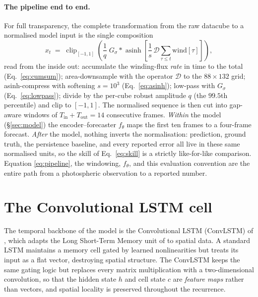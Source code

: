 \paragraph{The pipeline end to end.}
For full transparency, the complete transformation from the raw datacube to a
normalised model input is the single composition
\begin{equation}
  x_t \;=\; \operatorname{clip}_{[-1,1]}\!\left(
    \frac{1}{q}\; G_\sigma * \operatorname{asinh}\!\left[
      \frac{1}{s}\,\mathcal{D}\!\sum_{\tau\le t}\mathrm{wind}[\tau]
    \right]\right),
  \label{eq:pipeline}
\end{equation}
read from the inside out: accumulate the winding-flux \emph{rate} in time to the
total (Eq.~\eqref{eq:cumsum}); area-downsample with the operator $\mathcal{D}$ to
the $88\times132$ grid; asinh-compress with softening $s=10^3$
(Eq.~\eqref{eq:asinh}); low-pass with $G_\sigma$ (Eq.~\eqref{eq:lowpass}); divide
by the per-cube robust amplitude $q$ (the $99.5$th percentile) and clip to
$[-1,1]$. The normalised sequence is then cut into gap-aware windows of
$T_{\text{in}}+T_{\text{out}}=14$ consecutive frames. \emph{Within} the model
(\S\ref{sec:model}) the encoder--forecaster $f_\theta$ maps the first ten frames
to a four-frame forecast. \emph{After} the model, nothing inverts the
normalisation: prediction, ground truth, the persistence baseline, and every
reported error all live in these same normalised units, so the skill of
Eq.~\eqref{eq:skill} is a strictly like-for-like comparison. Equation
\eqref{eq:pipeline}, the windowing, $f_\theta$, and this evaluation convention are
the entire path from a photospheric observation to a reported number.

\section{The Convolutional LSTM cell}
\label{sec:convlstm}

The temporal backbone of the model is the Convolutional LSTM (ConvLSTM) of
\citet{shi2015}, which adapts the Long Short-Term Memory unit of
\citet{hochreiter1997} to spatial data. A standard LSTM maintains a memory cell
gated by learned nonlinearities but treats its input as a flat vector, destroying
spatial structure. The ConvLSTM keeps the same gating logic but replaces every
matrix multiplication with a two-dimensional convolution, so that the hidden
state $h$ and cell state $c$ are \emph{feature maps} rather than vectors, and
spatial locality is preserved throughout the recurrence.

